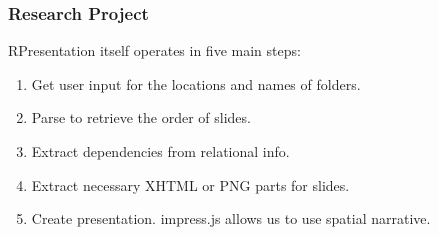 \begin{frame}
  \frametitle{Research Project}
  \begin{module}[id=researchProject]
     
RPresentation itself operates in five main steps:\\
\begin{enumerate}
\item Get user input for the locations and names of folders.
\item Parse \sTeX to retrieve the order of slides.
\item Extract dependencies from relational info.
\item Extract necessary XHTML or PNG parts for slides.
\item Create presentation. impress.js allows us to use spatial narrative.
\end{enumerate}


\end{module}
\end{frame}

